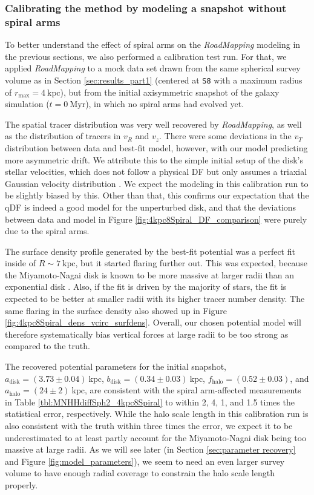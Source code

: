 \documentclass[iop,revtex4,numberedappendix,appendixfloats]{emulateapj}
\newcommand{\RM}{{\sl RoadMapping}}
\begin{document}
\subsubsection{Calibrating the method by modeling a snapshot without spiral arms} \label{sec:MNdHHinit}

To better understand the effect of spiral arms on the \RM{} modeling in the previous sections, we also performed a calibration test run. For that, we applied \RM{} to a mock data set drawn from the same spherical survey volume as in Section \ref{sec:results_part1} (centered at \texttt{S8} with a maximum radius of $r_\text{max}=4~\text{kpc}$), but from the initial axisymmetric snapshot of the galaxy simulation ($t=0~\text{Myr}$), in which no spiral arms had evolved yet.

The spatial tracer distribution was very well recovered by \RM{}, as well as the distribution of tracers in $v_R$ and $v_z$. There were some deviations in the $v_T$ distribution between data and best-fit model, however, with our model predicting more asymmetric drift. We attribute this to the simple initial setup of the disk's stellar velocities, which does not follow a physical DF but only assumes a triaxial Gaussian velocity distribution \citep{2005MNRAS.361..776S}. We expect the modeling in this calibration run to be slightly biased by this. Other than that, this confirms our expectation that the qDF is indeed a good model for the unperturbed disk, and that the deviations between data and model in Figure \ref{fig:4kpc8Spiral_DF_comparison} were purely due to the spiral arms.

The surface density profile generated by the best-fit potential was a perfect fit inside of $R\sim7~\text{kpc}$, but it started flaring further out. This was expected, because the Miyamoto-Nagai disk is known to be more massive at larger radii than an exponential disk \citep{2015MNRAS.448.2934S}. Also, if the fit is driven by the majority of stars, the fit is expected to be better at smaller radii with its higher tracer number density. The same flaring in the surface density also showed up in Figure \ref{fig:4kpc8Spiral_dens_vcirc_surfdens}. Overall, our chosen potential model will therefore systematically bias vertical forces at large radii to be too strong as compared to the truth.

The recovered potential parameters for the initial snapshot, $a_\text{disk}=(3.73 \pm 0.04) ~\text{kpc}$, $b_\text{disk}=(0.34 \pm 0.03) ~\text{kpc}$, $f_\text{halo}=(0.52 \pm 0.03)$, and $a_\text{halo}=(24 \pm 2) ~\text{kpc}$, are consistent with the spiral arm-affected measurements in Table \ref{tbl:MNHHdiffSph2_4kpc8Spiral} to within 2, 4, 1, and 1.5 times the statistical error, respectively. While the halo scale length in this calibration run is also consistent with the truth within three times the error, we expect it to be underestimated to at least partly account for the Miyamoto-Nagai disk being too massive at large radii. As we will see later (in Section \ref{sec:parameter recovery} and Figure \ref{fig:model_parameters}), we seem to need an even larger survey volume to have enough radial coverage to constrain the halo scale length properly.
\end{document}
